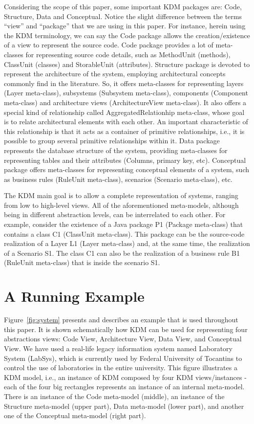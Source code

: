 Considering the scope of this paper, some important KDM packages are: Code, Structure, Data and Conceptual. Notice the slight difference between the terms ``view'' and ``package'' that we are using in this paper. For instance, herein using the KDM terminology, we can say the Code package allows the creation/existence of a view to represent the source code. Code package provides a lot of meta-classes for representing source code details, such as MethodUnit (methods), ClassUnit (classes) and StorableUnit (attributes). Structure package is devoted to represent the architecture of the system, employing architectural concepts commonly find in the literature. So, it offers meta-classes for representing layers (Layer meta-class), subsystems (Subsystem meta-class), components (Component meta-class) and architecture views (ArchitectureView meta-class). It also offers a special kind of relationship called AggregatedRelationhip meta-class, whose goal is to relate architectural elements with each other. An important characteristic of this relationship is that it acts as a container of primitive relationships, i.e., it is possible to group several primitive relationships within it. Data package represents the database structure of the system, providing meta-classes for representing tables and their attributes (Columns, primary key, etc). Conceptual package offers meta-classes for representing conceptual elements of a system, such as business rules (RuleUnit meta-class), scenarios (Scenario meta-class), etc. 

The KDM main goal is to allow a complete representation of systems, ranging from low to high-level views. All of the aforementioned meta-models, although being in different abstraction levels, can be interrelated to each other. For example, consider the existence of a Java package P1 (Package meta-class) that contains a class C1 (ClassUnit meta-class). This package can be the source-code realization of a Layer L1 (Layer meta-class) and, at the same time, the realization of a Scenario S1. The class C1 can also be the realization of a business rule B1 (RuleUnit meta-class) that is inside the scenario S1. 

\section{A Running Example}\label{sec:running_example}

Figure~\ref{fig:system} presents and describes an example that is used throughout this paper. It is shown schematically how KDM can be used for representing four abstractions views: Code View, Architecture View, Data View, and Conceptual View. We have used a real-life legacy information system named Laboratory System (LabSys), which is currently used by Federal University of Tocantins to control the use of laboratories in the entire university. This figure illustrates a KDM model, i.e., an instance of KDM composed by four KDM views/instances - each of the four big rectangles represents an instance of an internal meta-model. There is an instance of the Code meta-model (middle), an instance of the Structure meta-model (upper part), Data meta-model (lower part), and another one of the Conceptual meta-model (right part). 

